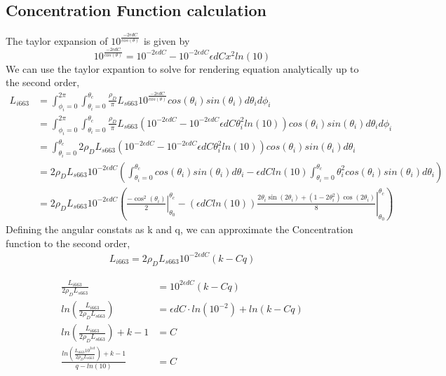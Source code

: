 \documentclass{article}
\begin{document}
\subsection{Concentration Function calculation}
The taylor expansion of $ 10^{\frac{-2\epsilon d C}{cos(\theta)}}$ is given by
$$ 10^{\frac{-2\epsilon d C}{ cos(\theta)}} = 10^{-2\epsilon d C} - 10^{-2\epsilon d C}\epsilon d C x^2ln(10)$$
We can use the taylor expantion to solve for rendering equation analytically up to the second order,
\begin{align*}
  L_{i 663} &= \int^{2\pi}_{\phi_i = 0}\int^{\theta_c}_{\theta_i = 0}
  \frac{\rho_D}{\pi}  L_{s 663} 10^\frac{-2\epsilon d C}{cos(\theta)}cos(\theta_i)sin(\theta_i)d\theta_i d\phi_i
      \\    &=  \int^{2\pi}_{\phi_i = 0}\int^{\theta_c}_{\theta_i = 0}
      \frac{\rho_D}{\pi}  L_{s 663}\left(10^{-2\epsilon d C} - 10^{-2\epsilon d C}\epsilon d C \theta_i^2ln(10)\right)
      cos(\theta_i)sin(\theta_i)d\theta_i d\phi_i
      \\    &= \int^{\theta_c}_{\theta_i = 0}
      2\rho_D  L_{s 663}\left(10^{-2\epsilon d C} - 10^{-2\epsilon d C}\epsilon d C \theta_i^2ln(10)\right)
      cos(\theta_i)sin(\theta_i)d\theta_i
      \\ &= 2\rho_D  L_{s 663}10^{-2\epsilon d C} \left(
      \int^{\theta_c}_{\theta_i = 0}cos(\theta_i)sin(\theta_i)d\theta_i-\epsilon d C ln(10)\int^{\theta_c}_{\theta_i = 0} \theta_i^2 cos(\theta_i)sin(\theta_i)d\theta_i
      \right)
      \\&= 2\rho_D  L_{s 663}10^{-2\epsilon d C} \left(\left. \frac{-\cos^2(\theta_i)}{2}\right \rvert^{\theta_c}_{\theta_0} - \left.
      \left(\epsilon d C ln(10)\right)\frac{2\theta_i\sin\left(2\theta_i\right)+\left(1-2\theta_i^2\right)\cos\left(2\theta_i\right)}{8} \right \rvert^{\theta_c}_{\theta_0}
      \right)
\end{align*}
Defining the angular constats as k and q, we can approximate the Concentration function to the second order,
\begin{align*}
L_{i 663} = 2\rho_D  L_{s 663}10^{-2\epsilon d C} (k - Cq)
\end{align*}

\begin{align*}
\frac{L_{i 663}}{2\rho_D  L_{s 663}} &= 10^{2\epsilon d C}(k - Cq)\\
ln \left( \frac{L_{i 663} }{2\rho_D  L_{s 663}} \right ) &= \epsilon d C\cdot ln(10^{-2})+ln(k - Cq) \\
ln \left( \frac{L_{i 663} }{2\rho_D  L_{s 663}} \right ) +k -1 &= C \\
\frac{ln \left( \frac{L_{i 663} 10^{2\epsilon d} }{2\rho_D  L_{s 663}} \right ) +k -1}{q - ln(10)} &= C
\end{align*}
\end{document}
